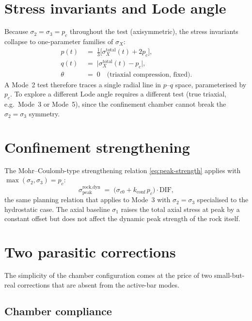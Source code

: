 \documentclass[11pt,a4paper,openany]{book}
\theoremstyle{handbook}
\newcommand{\sig}{\sigma}
\begin{document}
\section{Stress invariants and Lode angle}\label{sec:mode2-lode}

Because $\sig_2=\sig_3=p_c$ throughout the test (axisymmetric), the
stress invariants collapse to one-parameter families of $\sig_X$:
\begin{align}
  p(t)   &\;=\; \tfrac{1}{3}\bigl[\sig_X^{\text{total}}(t) + 2p_c\bigr], \\
  q(t)   &\;=\; \bigl|\sig_X^{\text{total}}(t) - p_c\bigr|, \\
  \theta &\;=\; 0 \quad\text{(triaxial compression, fixed).}
\end{align}
A Mode~2 test therefore traces a single radial line in $p$--$q$ space,
parameterised by $p_c$. To explore a different Lode angle requires a
different test (true triaxial, e.g.\ Mode~3 or Mode~5), since the
confinement chamber cannot break the $\sig_2=\sig_3$ symmetry.

\section{Confinement strengthening}

The Mohr--Coulomb-type strengthening relation
\eqref{eq:peak-strength} applies with $\max(\sig_2,\sig_3)=p_c$:
\begin{equation}
  \sig_{\text{peak}}^{\text{rock,dyn}}
    \;=\; \bigl(\sig_{c0} + k_{\text{conf}}\,p_c\bigr)\cdot\text{DIF},
  \label{eq:mode2-peak-strength}
\end{equation}
the same planning relation that applies to Mode~3 with $\sig_2=\sig_3$
specialised to the hydrostatic case. The axial baseline $\sig_1$ raises
the total axial stress at peak by a constant offset but does not affect
the dynamic peak strength of the rock itself.

\section{Two parasitic corrections}\label{sec:mode2-chamber}

The simplicity of the chamber configuration comes at the price of two
small-but-real corrections that are absent from the active-bar modes.

\subsection{Chamber compliance}
\end{document}
